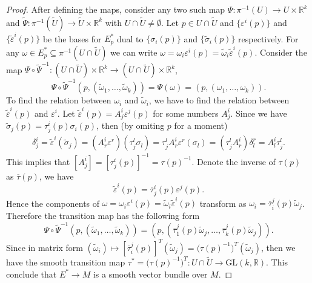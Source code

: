 \documentclass[a4paper]{article}
\theoremstyle{remark}
\newcommand{\er}{\mathbb{R}} %
\newcommand{\rk}{\mathbb{R}^k} %
\newcommand{\subhim}{\subseteq} %
\newcommand{\GLkr}{\text{GL}(k,\er)} %
\newcommand\wtilde[1]{\widetilde{#1}} %
\begin{document}
\begin{proof}
After defining the maps, consider any two such map $\Psi : \pi^{-1}(U) \to U \times \rk$ and $\wtilde{\Psi} : \pi^{-1} (\wtilde{U}) \to \wtilde{U} \times \rk$ with $U \cap \wtilde{U} \neq \emptyset$. Let $p \in U \cap \wtilde{U}$ and $\{\varepsilon^i(p)\}$ and $\{\wtilde{\varepsilon}^i(p)\}$ be the bases for $E^*_p$ dual to $\{\sigma_i(p)\}$ and $\{\wtilde{\sigma}_i(p)\}$ respectively. For any $\omega \in E^*_p \subhim \pi^{-1} ( U \cap \wtilde{U})$ we can write $\omega = \omega_i \varepsilon^i(p) = \wtilde{\omega}_i \wtilde{\varepsilon}^i(p)$. Consider the map $\Psi \circ \wtilde{\Psi}^{-1} : (U\cap \wtilde{U}) \times \rk \to (U\cap \wtilde{U}) \times \rk $, 
$$
\Psi \circ \wtilde{\Psi}^{-1} (p, (\wtilde{\omega}_1,\dots,\wtilde{\omega}_k) ) = \Psi (\omega) = (p, (\omega_1,\dots, \omega_k)).
$$
To find the relation between $\omega_i$ and $\wtilde{\omega}_i$, we have to find the relation between $\wtilde{\varepsilon}^i(p)$ and $\varepsilon^i$. Let $\wtilde{\varepsilon}^i(p) = A^i_j \varepsilon^j(p)$ for some numbers $A^i_j$. Since we have $\wtilde{\sigma}_j(p) = \tau^i_j (p) \sigma_i(p)$, then (by omiting $p$ for a moment)
\begin{align*}
\delta^i_j=\wtilde{\varepsilon}^i (\wtilde{\sigma}_j) = (A^i_r \varepsilon^r) (\tau^l_j \sigma_l)= \tau^l_j A^i_r \varepsilon^r( \sigma_l)  = (\tau^l_j  A^i_r) \delta^r_l =   A^i_l \tau^l_j.
\end{align*}
This implies that $[A^i_j] = [\tau^i_j(p)]^{-1} =  \tau(p)^{-1}$. Denote the inverse of $\tau(p)$ as $\overline{\tau}(p)$, we have
$$
\wtilde{\varepsilon}^i(p) = \overline{\tau}^i_j(p)  \varepsilon^j(p).
$$
Hence the components of $\omega = \omega_i \varepsilon^i(p) = \wtilde{\omega}_i \wtilde{\varepsilon}^i(p)$ transform as $\omega_i =  \overline{\tau}^j_i(p) \wtilde{\omega}_j $. Therefore the transition map has the following form
$$
\Psi \circ \wtilde{\Psi}^{-1} (p, (\wtilde{\omega}_1,\dots,\wtilde{\omega}_k) )  =(p, (\overline{\tau}^j_1(p) \wtilde{\omega}_j,\dots,\overline{\tau}^j_k(p) \wtilde{\omega}_j) ).
$$
Since in matrix form $(\wtilde{\omega}_i) \mapsto [\overline{\tau}_i^j(p)]^T (\wtilde{\omega}_j) = \big(\tau(p)^{-1} \big)^T (\wtilde{\omega}_j) $, then we have the smooth transition map  $\tau^* = \big(\tau(p)^{-1} \big)^T :  U \cap \wtilde{U} \to \GLkr$. This conclude that $E^* \to M$ is a smooth vector bundle over $M$.
\end{proof}
\end{document}
